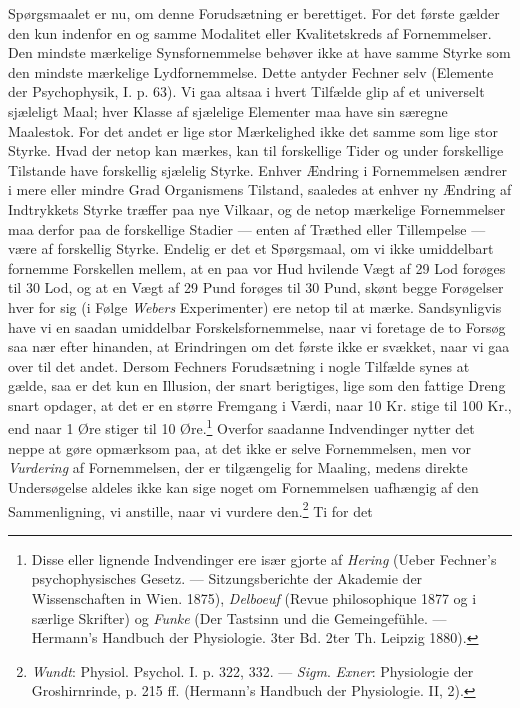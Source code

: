 \documentclass[12pt,a4paper,openany]{book}
\newcommand{\opage}[1]{\marginnote{\footnotesize\textit{[#1]}}}
\begin{document}
Spørgsmaalet er nu, om denne Forudsætning er berettiget. For det første
gælder den kun indenfor en og samme Modalitet eller Kvalitetskreds af
Fornemmelser. Den mindste mærkelige Synsfornemmelse behøver ikke at have
samme Styrke som den mindste mærkelige Lydfornemmelse. Dette antyder
Fechner selv (Elemente der Psychophysik, I. p. 63). Vi gaa altsaa i
hvert Tilfælde glip af et universelt sjæleligt Maal; hver Klasse af
sjælelige Elementer maa have sin særegne Maalestok. For det andet er
lige stor Mærkelighed ikke det samme som lige stor Styrke. Hvad der
netop kan mærkes, kan til forskellige Tider og under forskellige
Tilstande have forskellig sjælelig Styrke. Enhver Ændring i Fornemmelsen
ændrer i mere eller mindre Grad Organismens Tilstand, saaledes at enhver
ny Ændring af Indtrykkets Styrke træffer paa nye Vilkaar, og de netop
mærkelige Fornemmelser maa derfor paa de forskellige Stadier --- enten
af Træthed eller Tillempelse --- være af forskellig Styrke.
\opage{27}Endelig er det et Spørgsmaal, om vi ikke umiddelbart fornemme
Forskellen mellem, at en paa vor Hud hvilende Vægt af 29 Lod forøges til
30 Lod, og at en Vægt af 29 Pund forøges til 30 Pund, skønt begge
Forøgelser hver for sig (i Følge \emph{Webers} Experimenter) ere netop
til at mærke. Sandsynligvis have vi en saadan umiddelbar
Forskelsfornemmelse, naar vi foretage de to Forsøg saa nær efter
hinanden, at Erindringen om det første ikke er svækket, naar vi gaa over
til det andet. Dersom Fechners Forudsætning i nogle Tilfælde synes at
gælde, saa er det kun en Illusion, der snart berigtiges, lige som den
fattige Dreng snart opdager, at det er en større Fremgang i Værdi, naar
10 Kr. stige til 100 Kr., end naar 1 Øre stiger til 10
Øre.\footnote[1]{Disse eller lignende Indvendinger ere især gjorte af
\emph{Hering} (Ueber Fechner’s psychophysisches Gesetz. ---
Sitzungsberichte der Akademie der Wissenschaften in Wien. 1875),
\emph{Delboeuf} (Revue philosophique 1877 og i særlige Skrifter) og
\emph{Funke} (Der Tastsinn und die Gemeingefühle. --- Hermann’s Handbuch
der Physiologie. 3ter Bd. 2ter Th. Leipzig 1880).} Overfor saadanne
Indvendinger nytter det neppe at gøre opmærksom paa, at det ikke er
selve Fornemmelsen, men vor \emph{Vurdering} af Fornemmelsen, der er
tilgængelig for Maaling, medens direkte Undersøgelse aldeles ikke kan
sige noget om Fornemmelsen uafhængig af den Sammenligning, vi anstille,
naar vi vurdere den.\footnote[2]{\emph{Wundt}: Physiol. Psychol. I. p.
322, 332. --- \emph{Sigm}. \emph{Exner}: Physiologie der Groshirnrinde,
p. 215 ff. (Hermann’s Handbuch der Physiologie. II, 2).} Ti for det
\end{document}
